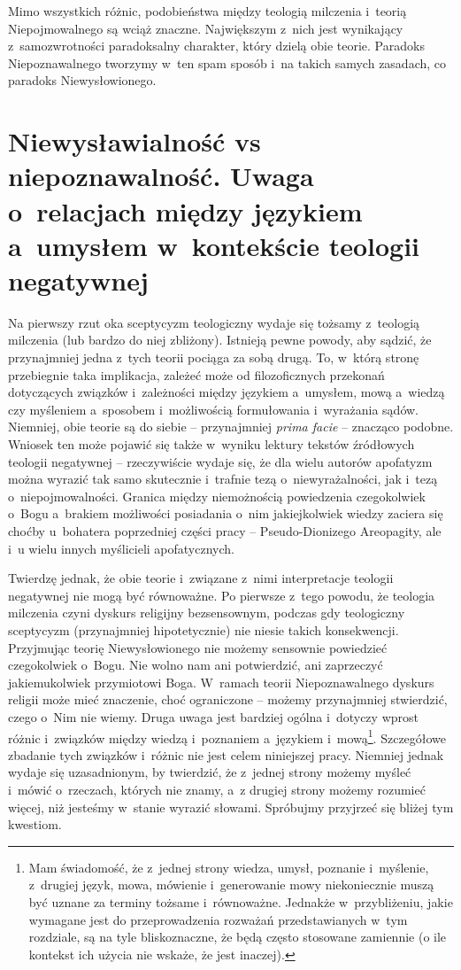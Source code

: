 Mimo wszystkich różnic, podobieństwa między teologią milczenia i~teorią Niepojmowalnego są wciąż znaczne. Największym z~nich jest wynikający z~samozwrotności paradoksalny charakter, który dzielą obie teorie. Paradoks Niepoznawalnego tworzymy w~ten spam sposób i~na takich samych zasadach, co paradoks Niewysłowionego.


\section{Niewysławialność vs niepoznawalność. Uwaga o~relacjach między językiem a~umysłem w~kontekście teologii negatywnej}\label{scep-werapo}

Na pierwszy rzut oka sceptycyzm teologiczny wydaje się tożsamy z~teologią milczenia (lub bardzo do niej zbliżony). Istnieją pewne powody, aby sądzić, że przynajmniej jedna z~tych teorii pociąga za sobą drugą. To, w~którą stronę przebiegnie taka implikacja, zależeć może od filozoficznych przekonań dotyczących związków i~zależności między językiem a~umysłem, mową a~wiedzą czy myśleniem a~sposobem i~możliwością formułowania i~wyrażania sądów. Niemniej, obie teorie są do siebie -- przynajmniej \textit{prima facie} -- znacząco podobne. Wniosek ten może pojawić się także w~wyniku lektury tekstów źródłowych teologii negatywnej -- rzeczywiście wydaje się, że dla wielu autorów apofatyzm można wyrazić tak samo skutecznie i~trafnie tezą o~niewyrażalności, jak i~tezą o~niepojmowalności. Granica między niemożnością powiedzenia czegokolwiek o~Bogu a~brakiem możliwości posiadania o~nim jakiejkolwiek wiedzy zaciera się choćby u~bohatera poprzedniej części pracy -- Pseudo-Dionizego Areopagity, ale i~u wielu innych myślicieli apofatycznych.

Twierdzę jednak, że obie teorie i~związane z~nimi interpretacje teologii negatywnej nie mogą być równoważne. Po pierwsze z~tego powodu, że teologia milczenia czyni dyskurs religijny bezsensownym, podczas gdy teologiczny sceptycyzm (przynajmniej hipotetycznie) nie niesie takich konsekwencji. Przyjmując teorię Niewysłowionego nie możemy sensownie powiedzieć czegokolwiek o~Bogu. Nie wolno nam ani potwierdzić, ani zaprzeczyć jakiemukolwiek przymiotowi Boga. W~ramach teorii Niepoznawalnego dyskurs religii może mieć znaczenie, choć ograniczone -- możemy przynajmniej stwierdzić, czego o~Nim nie wiemy. Druga uwaga jest bardziej ogólna i~dotyczy wprost różnic i~związków między wiedzą i~poznaniem a~językiem i~mową\footnote{Mam świadomość, że z~jednej strony wiedza, umysł, poznanie i~myślenie, z~drugiej język, mowa, mówienie i~generowanie mowy niekoniecznie muszą być uznane za terminy tożsame i~równoważne. Jednakże w~przybliżeniu, jakie wymagane jest do przeprowadzenia rozważań przedstawianych w~tym rozdziale, są na tyle bliskoznaczne, że będą często stosowane zamiennie (o ile kontekst ich użycia nie wskaże, że jest inaczej).}. Szczegółowe zbadanie tych związków i~różnic nie jest celem niniejszej pracy. Niemniej jednak wydaje się uzasadnionym, by twierdzić, że z~jednej strony możemy myśleć i~mówić o~rzeczach, których nie znamy, a~z drugiej strony możemy rozumieć więcej, niż jesteśmy w~stanie wyrazić słowami. Spróbujmy przyjrzeć się bliżej tym kwestiom.

